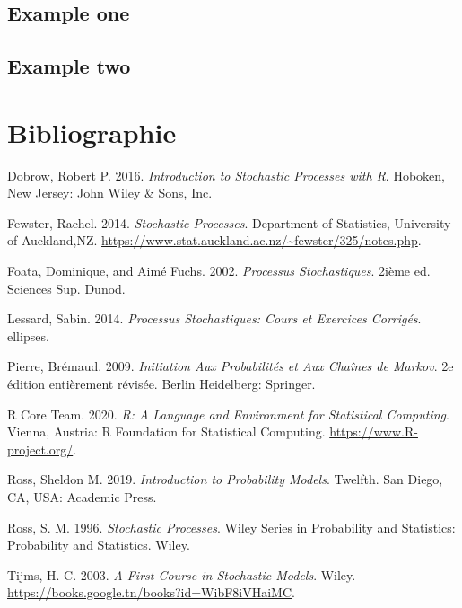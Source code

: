 \documentclass[
]{book}
\theoremstyle{definition}
\theoremstyle{definition}
\theoremstyle{definition}
\theoremstyle{remark}
\begin{document}
\hypertarget{example-one}{%
\section{Example one}\label{example-one}}

\hypertarget{example-two}{%
\section{Example two}\label{example-two}}

\hypertarget{bibliographie}{%
\chapter*{Bibliographie}\label{bibliographie}}

\hypertarget{refs}{}
\leavevmode\hypertarget{ref-Dobrow2016}{}%
Dobrow, Robert P. 2016. \emph{Introduction to Stochastic Processes with R}. Hoboken, New Jersey: John Wiley \& Sons, Inc.

\leavevmode\hypertarget{ref-rachel2012}{}%
Fewster, Rachel. 2014. \emph{Stochastic Processes}. Department of Statistics, University of Auckland,NZ. \url{https://www.stat.auckland.ac.nz/~fewster/325/notes.php}.

\leavevmode\hypertarget{ref-dominique2002}{}%
Foata, Dominique, and Aimé Fuchs. 2002. \emph{Processus Stochastiques}. 2ième ed. Sciences Sup. Dunod.

\leavevmode\hypertarget{ref-sabin}{}%
Lessard, Sabin. 2014. \emph{Processus Stochastiques: Cours et Exercices Corrigés}. ellipses.

\leavevmode\hypertarget{ref-bremaud}{}%
Pierre, Brémaud. 2009. \emph{Initiation Aux Probabilités et Aux Chaînes de Markov}. 2e édition entièrement révisée. Berlin Heidelberg: Springer.

\leavevmode\hypertarget{ref-R-base}{}%
R Core Team. 2020. \emph{R: A Language and Environment for Statistical Computing}. Vienna, Austria: R Foundation for Statistical Computing. \url{https://www.R-project.org/}.

\leavevmode\hypertarget{ref-Ross97}{}%
Ross, Sheldon M. 2019. \emph{Introduction to Probability Models}. Twelfth. San Diego, CA, USA: Academic Press.

\leavevmode\hypertarget{ref-ross1996stochastic}{}%
Ross, S. M. 1996. \emph{Stochastic Processes}. Wiley Series in Probability and Statistics: Probability and Statistics. Wiley.

\leavevmode\hypertarget{ref-tijms2003first}{}%
Tijms, H. C. 2003. \emph{A First Course in Stochastic Models}. Wiley. \url{https://books.google.tn/books?id=WibF8iVHaiMC}.
\end{document}
